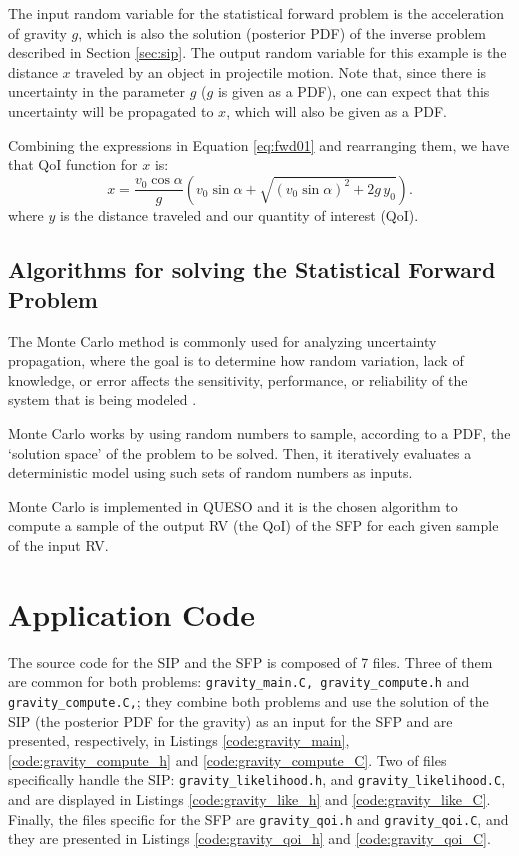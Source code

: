 The input random variable for the statistical forward problem is the acceleration of gravity $g$, which is also the solution (posterior PDF) of the inverse problem described in Section \ref{sec:sip}. The output random variable for this example is the distance $x$ traveled by an object in projectile motion. Note that, since there is uncertainty in the parameter $g$ ($g$ is given as a PDF), one can expect that this uncertainty will be propagated to $x$, which will also be given as a PDF.

Combining the expressions in Equation \ref{eq:fwd01} and rearranging them, we have that QoI function for $x$ %
is: 
\begin{equation}\label{eq:fp_deterministic}
x=\dfrac{ v_0 \cos \alpha }{g} \left( v_0  \sin \alpha  + \sqrt{ ( v_0  \sin \alpha)^2 + 2g\, y_0 }\right).                                                                                        
\end{equation}
where $y$ is the distance traveled and our quantity of interest (QoI). 


\subsection{Algorithms for solving the Statistical Forward Problem}




The Monte Carlo method is commonly used for analyzing uncertainty propagation, where the goal is to determine how random variation, lack of knowledge, or error affects the sensitivity, performance, or reliability of the system that is being modeled \cite{RoCa04}.

Monte Carlo works by using random numbers to sample, according to a PDF, the `solution space' of the problem to be solved.
Then, it iteratively evaluates a deterministic model using such sets of random numbers as inputs.


Monte Carlo is implemented in QUESO and it is the chosen algorithm to compute a sample of the output RV (the QoI) of the SFP for each given sample of the input RV. 

\section{Application Code}\label{sec:application_code}

The source code for the SIP and the SFP is composed of 7 files.
Three of them are common for both problems: \texttt{gravity\_main.C, gravity\_compute.h} and \texttt{gravity\_compute.C,}; they combine both problems and use the solution of the SIP (the posterior PDF for the gravity) as an input for the SFP and are presented, respectively, in Listings \ref{code:gravity_main}, \ref{code:gravity_compute_h} and \ref{code:gravity_compute_C}.
Two of files specifically  handle the SIP: \texttt{gravity\_likelihood.h}, and \texttt{gravity\_likelihood.C}, and are displayed in Listings \ref{code:gravity_like_h} and \ref{code:gravity_like_C}. Finally, the files specific for the SFP are \texttt{gravity\_qoi.h} and \texttt{gravity\_qoi.C}, and they are presented in Listings \ref{code:gravity_qoi_h} and \ref{code:gravity_qoi_C}.

